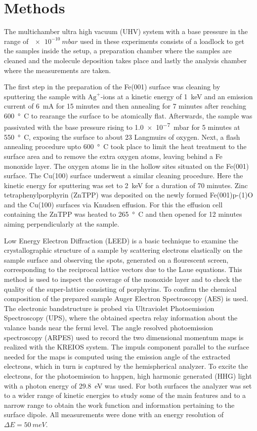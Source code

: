 \chapter{Methods}

The multichamber ultra high vacuum (UHV) system with a base pressure in the range of $\qty{e-10}{mbar}$ used in these experiments consists of a loadlock to get the samples inside the setup, a preparation chamber where the samples are cleaned and the molecule deposition takes place and lastly the analysis chamber where the measurements are taken.

The first step in the preparation of the Fe(001) surface was cleaning by sputtering the sample with $\mathrm{Ag}^+$-ions at a kinetic energy of \qty{1}{keV} and an emission current of \qty{6}{mA} for 15 minutes and then annealing for 7 minutes after reaching \qty{600}{°C} to rearange the surface to be atomically flat.
Afterwards, the sample was passivated with the base pressure rising to \qty{1.0e-7}{mbar} for 5 minutes at \qty{550}{°C}, exposing the surface to about 23 Langmuirs of oxygen.
Next, a flash annealing procedure upto \qty{600}{°C} took place to limit the heat treatment to the surface area and to remove the extra oxygen atoms, leaving behind a Fe monoxide layer.
The oxygen atoms lie in the hollow sites situated on the Fe(001) surface.
The Cu(100) surface underwent a similar cleaning procedure.
Here the kinetic energy for sputtering was set to \qty{2}{keV} for a duration of 70 minutes.
Zinc tetraphenylporphyrin (ZnTPP) was deposited on the newly formed Fe(001)p-(1)O and the Cu(100) surfaces via Knudsen effusion.
For this the effusion cell containing the ZnTPP was heated to \qty{265}{°C} and then opened for 12 minutes aiming perpendicularly at the sample.

Low Energy Electron Diffraction (LEED) is a basic technique to examine the crystallographic structure of a sample by scattering electrons elastically on the sample surface and observing the spots, generated on a flourescent screen, corresponding to the reciprocal lattice vectors due to the Laue equations.
This method is used to inspect the coverage of the monoxide layer and to check the quality of the super-lattice consisting of porphyrins.
To confirm the chemical composition of the prepared sample Auger Electron Spectroscopy (AES) is used.
The electronic bandstructure is probed via Ultraviolet Photoemission Spectroscopy (UPS), where the obtained spectra relay information about the valance bands near the fermi level.
The angle resolved photoemission spectroscopy (ARPES) used to record the two dimensional momentum maps is realized with the KREIOS system.
The impuls component parallel to the surface needed for the maps is computed using the emission angle of the extracted electrons, which in turn is captured by the hemispherical analyzer.
To excite the electrons, for the photoemission to happen, high harmonic generated (HHG) light with a photon energy of \qty{29,8}{eV} was used.
For both surfaces the analyzer was set to a wider range of kinetic energies to study some of the main features and to a narrow range to obtain the work function and information pertaining to the surface dipole.
All measurements were done with an energy resolution of $\Delta E = \qty{50}{meV}$.
